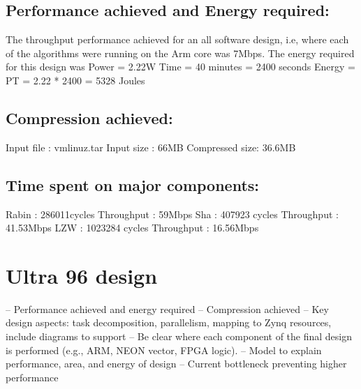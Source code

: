 \documentclass{article}
\begin{document}
\subsection{Performance achieved and Energy required:}
The throughput performance achieved for an all software design, i.e, where each of the algorithms were running on the Arm core was 7Mbps. 
\newline\newline 
The energy required for this design was 
Power = 2.22W 
\newline
Time = 40 minutes = 2400 seconds
\newline
Energy = PT = 2.22 * 2400 
\newline
       = 5328 Joules

\subsection{Compression achieved: }
    Input file : vmlinuz.tar       
    \newline
    Input size : 66MB
    \newline
    Compressed size: 36.6MB
    \newline\newline

\subsection{Time spent on major components:}

Rabin : 286011cycles
\newline
        Throughput : 59Mbps
\newline\newline
Sha : 407923 cycles
\newline
      Throughput : 41.53Mbps
\newline\newline
LZW : 1023284 cycles
\newline
Throughput : 16.56Mbps
\newline


\section{Ultra 96 design}
– Performance achieved and energy required
– Compression achieved
– Key design aspects: task decomposition, parallelism, mapping to Zynq resources, include diagrams to support
– Be clear where each component of the final design is performed (e.g., ARM, NEON vector, FPGA logic).
– Model to explain performance, area, and energy of design
– Current bottleneck preventing higher performance
\end{document}
